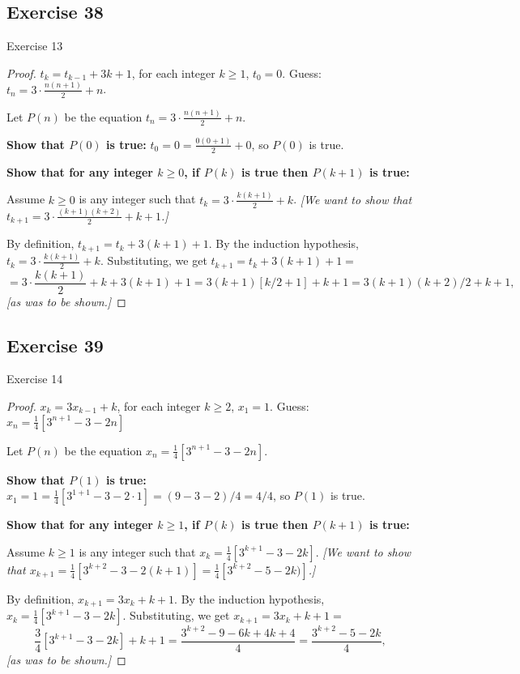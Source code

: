 \documentclass[14pt]{extarticle}
\newcommand{\dps}{\displaystyle}
\begin{document}
\subsection{Exercise 38}
Exercise 13

\begin{proof}
    \(t_k = t_{k-1} + 3k + 1\), for each integer \(k \geq 1\), \(t_0 = 0\).
    Guess: \(\dps t_n = 3 \cdot \frac{n(n+1)}{2} + n\).

    Let $P(n)$ be the equation \(\dps t_n = 3 \cdot \frac{n(n+1)}{2} + n\).

        {\bf Show that \(P(0)\) is true:} \(t_0 = 0 = \dps \frac{0(0+1)}{2} + 0\), so $P(0)$ is true.

        {\bf Show that for any integer \(k \geq 0\), if \(P(k)\) is true then \(P(k+1)\) is true:}

    Assume \(k \geq 0\) is any integer such that \(\dps t_k = 3 \cdot \frac{k(k+1)}{2} + k\).
        {\it [We want to show that \(\dps t_{k+1} = 3 \cdot \frac{(k+1)(k+2)}{2} + k+1\).]}

    By definition, \(t_{k+1} = t_k + 3(k+1) + 1\).
    By the induction hypothesis, \(\dps t_k = 3 \cdot \frac{k(k+1)}{2} + k\).
    Substituting, we get \(t_{k+1} = t_k + 3(k+1) + 1 = \)
    \[
        = 3 \cdot \frac{k(k+1)}{2} + k + 3(k+1) + 1 = 3(k+1)[k / 2 + 1] + k + 1 = 3(k+1)(k+2) / 2 + k + 1,
    \]
    {\it [as was to be shown.]}
\end{proof}

\subsection{Exercise 39}
Exercise 14

\begin{proof}
    \(x_k = 3x_{k-1} + k\), for each integer \(k \geq 2\), \(x_1 = 1\).
    Guess: \(\dps x_n = \frac{1}{4}\left[3^{n+1} - 3 - 2n\right]\)

    Let $P(n)$ be the equation \(\dps x_n = \frac{1}{4}\left[3^{n+1} - 3 - 2n\right]\).

        {\bf Show that \(P(1)\) is true:} \(x_1 = 1 = \dps \frac{1}{4}\left[3^{1+1} - 3 - 2 \cdot 1\right]
    = (9 - 3 - 2) / 4 = 4/4\), so $P(1)$ is true.

        {\bf Show that for any integer \(k \geq 1\), if \(P(k)\) is true then \(P(k+1)\) is true:}

    Assume \(k \geq 1\) is any integer such that \(\dps x_k = \frac{1}{4}\left[3^{k+1} - 3 - 2k\right]\).
        {\it [We want to show that \(\dps x_{k+1} = \frac{1}{4}\left[3^{k+2} - 3 - 2(k+1)\right]
                = \frac{1}{4}\left[3^{k+2} - 5 - 2k)\right]\).]}

    By definition, \(x_{k+1} = 3x_k + k + 1\).
    By the induction hypothesis, \(\dps x_k = \frac{1}{4}\left[3^{k+1} - 3 - 2k\right]\).
    Substituting, we get \(x_{k+1} = 3x_k + k + 1 = \)
    \[
        \frac{3}{4}\left[3^{k+1} - 3 - 2k\right] + k + 1 =
        \frac{3^{k+2} - 9 - 6k + 4k + 4}{4} =
        \frac{3^{k+2} - 5 - 2k}{4},
    \]
    {\it [as was to be shown.]}
\end{proof}
\end{document}
